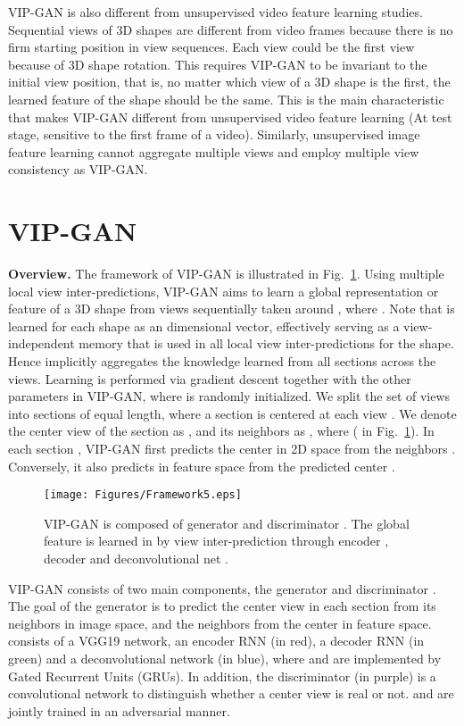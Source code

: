 \documentclass[letterpaper]{article} \usepackage{aaai19}  \usepackage{times}  \usepackage{helvet}  \usepackage{courier}  \usepackage{url}  \usepackage{graphicx}
\begin{document}
VIP-GAN is also different from unsupervised video feature learning studies. Sequential views of 3D shapes are different from video frames because there is no firm starting position in view sequences. Each view could be the first view because of 3D shape rotation. This requires VIP-GAN to be invariant to the initial view position, that is, no matter which view of a 3D shape is the first, the learned feature of the shape should be the same. This is the main characteristic that makes VIP-GAN different from unsupervised video feature learning (At test stage, sensitive to the first frame of a video). Similarly, unsupervised image feature learning cannot aggregate multiple views and employ multiple view consistency as VIP-GAN.

\section{VIP-GAN}
\label{sec:vip}
\noindent\textbf{Overview. }The framework of VIP-GAN is illustrated in Fig.~\ref{fig:framework}. Using multiple local view inter-predictions, VIP-GAN aims to learn a global  representation or feature  of a 3D shape  from  views 
sequentially taken around , where . Note that  is learned for each shape as an  dimensional vector, effectively serving as a view-independent memory that is used in all local view inter-predictions for the shape. Hence  implicitly aggregates the knowledge learned from all sections  across the  views. Learning  is performed via gradient descent together with the other parameters in VIP-GAN, where  is randomly initialized.
We split the set
of views into  sections of equal length, where a section  is centered at each view .
We denote the center view of the section as , and its  neighbors as , where  ( in Fig.~\ref{fig:framework}). In each section , VIP-GAN first predicts the center  in 2D space from the neighbors . Conversely, it also predicts  in feature space from the predicted center .

\begin{figure}[hb]
  \centering
\texttt{[image: Figures/Framework5.eps]}
\caption{\label{fig:framework} VIP-GAN is composed of generator  and discriminator . The global feature  is learned in  by view inter-prediction through encoder , decoder  and deconvolutional net .}
\end{figure}

VIP-GAN consists of two main components, the generator  and discriminator . The goal of the generator is to predict the center view in each section from its neighbors in image space, and the neighbors from the center in feature space.  consists of a VGG19 network, an encoder RNN  (in red), a decoder RNN  (in green) and a deconvolutional network  (in blue), where  and  are implemented by Gated Recurrent Units (GRUs). In addition, the discriminator  (in purple) is a convolutional network to distinguish whether a center view is real or not.  and  are jointly trained in an adversarial manner.
\end{document}
